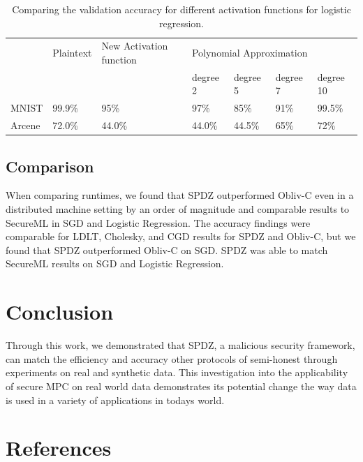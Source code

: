 \documentclass{article}
\begin{document}
\begin{table}[h!] 
\caption{Comparing the validation accuracy for different activation functions for logistic regression.}
\centering
\label{my-label}
\begin{tabular}{@{}lllllll@{}}
\toprule
       & Plaintext & New Activation function & \multicolumn{4}{l}{Polynomial Approximation} \\
       &           &                         & degree 2  & degree 5  & degree 7 & degree 10 \\ \midrule
MNIST  & 99.9\%    & 95\%                    & 97\%      & 85\%      & 91\%     & 99.5\%    \\
Arcene & 72.0\%    &           44.0\%              &   44.0\%        &    44.5\%       &    65\%      &    72\%       \\ \bottomrule
\end{tabular}
\vspace{-4mm}
\end{table}

\subsection{Comparison}

When comparing runtimes, we found that SPDZ outperformed Obliv-C even in a distributed machine setting by an order of magnitude and comparable results to SecureML in SGD and Logistic Regression. The accuracy findings were comparable for LDLT, Cholesky, and CGD results for SPDZ and Obliv-C, but we found that SPDZ outperformed Obliv-C on SGD. SPDZ was able to match SecureML results on SGD and Logistic Regression.

\section{Conclusion}

Through this work, we demonstrated that SPDZ, a malicious security framework, can match the efficiency and accuracy other protocols of semi-honest through experiments on real and synthetic data. This investigation into the applicability of secure MPC on real world data demonstrates its potential change the way data is used in a variety of applications in today\textquotesingle s world.

\section*{References}
\end{document}
